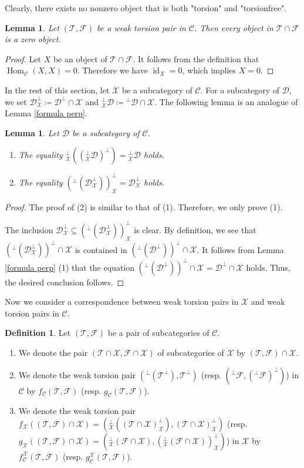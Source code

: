\documentclass{amsart}
\newtheorem{lem}[thm]{Lemma}
\theoremstyle{definition}
\newtheorem{dfn}[thm]{Definition}
\theoremstyle{remark}
\def\C{\mathcal{C}}
\def\D{\mathcal{D}}
\def\F{\mathcal{F}}
\def\Hom{\operatorname{Hom}}
\def\id{\operatorname{id}}
\def\T{\mathcal{T}}
\def\X{\mathcal{X}}
\begin{document}
Clearly, there exists no nonzero object that is both "torsion" and "torsionfree".

\begin{lem}\label{lem intersection}
Let $(\T,\F)$ be a weak torsion pair in $\C$. Then every object in $\T\cap\F$ is a zero object.
\end{lem}

\begin{proof}
Let $X$ be an object of $\T\cap\F$. It follows from the definition that $\Hom_\C(X,X)=0$. Therefore we have $\id_X=0$, which implies $X=0$.
\end{proof}

In the rest of this section, let $\X$ be a subcategory of $\C$. For a subcategory of $\D$, we set $\D^\perp_\X\coloneq\D^\perp\cap\X$ and $^\perp_\X\D\coloneq{}^\perp\D\cap\X$. The following lemma is an analogue of Lemma \ref{formula perp}.

\begin{lem}\label{formula perp X}
Let $\D$ be a subcategory of $\C$.
\begin{enumerate}[\rm(1)]
\item 
The equality $^\perp_\X((^\perp_\X\D)^\perp)={}^\perp_\X\D$ holds.
\item 
The equality $(^\perp(\D^\perp_\X))^\perp_\X=\D^\perp_\X$ holds.
\end{enumerate}
\end{lem}

\begin{proof}
The proof of (2) is similar to that of (1). Therefore, we only prove (1).

The inclusion $\D^\perp_\X\subseteq(^\perp(\D^\perp_\X))^\perp_\X$ is clear. By definition, we see that $(^\perp(\D^\perp_\X))^\perp\cap\X$ is contained in $(^\perp(\D^\perp))^\perp\cap\X$. It follows from Lemma \ref{formula perp} (1) that the equation $(^\perp(\D^\perp))^\perp\cap\X=\D^\perp\cap\X$ holds. Thus, the desired conclusion follows.
\end{proof}

Now we consider a correspondence between weak torsion pairs in $\X$ and weak torsion pairs in $\C$.

\begin{dfn}\label{dfn fg}
Let $(\T,\F)$ be a pair of subcategories of $\C$.
\begin{enumerate}[\rm(1)]
\item 
We denote the pair $(\T\cap\X,\F\cap\X)$ of subcategories of $\X$ by $(\T,\F)\cap\X$.
\item 
We denote the weak torsion pair $(^\perp(\T^\perp),\T^\perp)$ (resp. $(^\perp\F,(^\perp\F)^\perp)$) in $\C$ by $f_\C(\T,\F)$ (resp. $g_\C(\T,\F)$).
\item 
We denote the weak torsion pair $f_\X((\T,\F)\cap\X)=(^\perp_\X((\T\cap\X)^\perp_\X),(\T\cap\X)^\perp_\X)$ (resp. $g_\X((\T,\F)\cap\X)=(^\perp_\X(\F\cap\X),(^\perp_\X(\F\cap\X))^\perp_\X)$) in $\X$ by $f^\X_\C(\T,\F)$ (resp. $g^\X_\C(\T,\F)$).
\end{enumerate}
\end{dfn}
\end{document}
